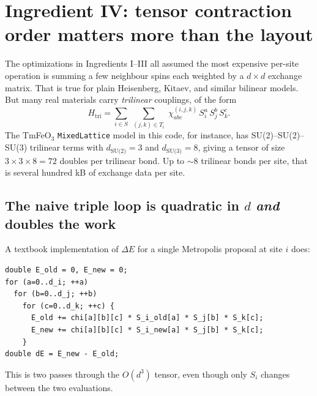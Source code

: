 \documentclass[11pt,letterpaper]{article}
\begin{document}
\section{Ingredient IV: tensor contraction order matters more than the
                       layout}
\label{sec:trilinear}

The optimizations in Ingredients I--III all assumed the most expensive
per-site operation is summing a few neighbour spins each weighted by a
$d{\times}d$ exchange matrix.  That is true for plain Heisenberg, Kitaev,
and similar bilinear models.  But many real materials carry
\emph{trilinear} couplings, of the form
\[
   H_{\text{tri}} = \sum_{i\in S}\;\sum_{(j,k)\in T_i}\;
   \chi^{(i,j,k)}_{abc}\, S_i^a\, S_j^b\, S_k^c .
\]
The TmFeO$_3$ \texttt{MixedLattice} model in this code, for instance,
has SU(2)--SU(2)--SU(3) trilinear terms with $d_{\text{SU(2)}} = 3$
and $d_{\text{SU(3)}} = 8$, giving a tensor of size
$3 \times 3 \times 8 = 72$ doubles per trilinear bond.  Up to
$\sim 8$ trilinear bonds per site, that is several hundred kB of
exchange data per site.

\subsection{The naive triple loop is quadratic in $d$ \emph{and} doubles
            the work}
A textbook implementation of $\Delta E$ for a single Metropolis
proposal at site $i$ does:
\begin{lstlisting}
double E_old = 0, E_new = 0;
for (a=0..d_i; ++a)
  for (b=0..d_j; ++b)
    for (c=0..d_k; ++c) {
      E_old += chi[a][b][c] * S_i_old[a] * S_j[b] * S_k[c];
      E_new += chi[a][b][c] * S_i_new[a] * S_j[b] * S_k[c];
    }
double dE = E_new - E_old;
\end{lstlisting}
This is two passes through the $O(d^{3})$ tensor, even though only
$S_i$ changes between the two evaluations.
\end{document}
